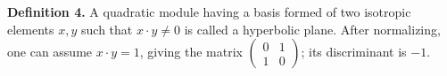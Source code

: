 \textbf{Definition 4.} A quadratic module having a basis formed of two isotropic elements $x, y$ such that $x \cdot y \neq 0$ is called a hyperbolic plane. After normalizing, one can assume $x \cdot y = 1$, giving the matrix $\begin{pmatrix} 0 & 1 \\ 1 & 0 \end{pmatrix}$; its discriminant is $-1$.
